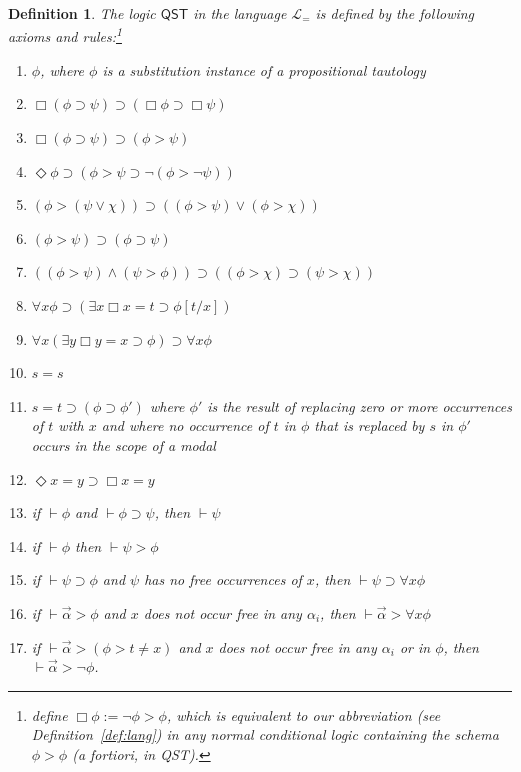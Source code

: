 \documentclass[12pt]{article}
\newtheorem{definition}{Definition}
\newcommand{\would}{\mathbin{>}}
\newcommand{\nec}{\mathop{\Box}}
\newcommand{\pos}{\mathop{\Diamond}}
\newcommand{\then}{\mathbin{\supset}}
\begin{document}
\begin{definition}
\label{def:ST}
    The logic $\mathsf{QST}$ in the language $\mathcal{L}_=$ is defined by the following axioms and rules:\footnote{\cite[p.~25]{StalnakerThomason1970} define $\nec\phi:=\neg\phi\would\phi$, which is equivalent to our abbreviation (see Definition~\ref{def:lang}) in any normal conditional logic containing the schema $\phi\would\phi$ (a fortiori, in \textsf{QST}).} 
    \begin{enumerate}
        \item $\phi$, where $\phi$ is a substitution instance of a propositional tautology
        \item $\nec(\phi \then \psi) \then (\nec\phi \then \nec\psi)$
        \item $\nec(\phi \then \psi) \then (\phi \would \psi)$
        \item $\pos\phi \then (\phi \would \psi \then \neg(\phi \would \neg\psi))$
        \item $(\phi \would (\psi \vee \chi)) \then ((\phi \would \psi) \vee (\phi \would \chi))$
        \item $(\phi \would \psi) \then (\phi \then \psi)$
        \item $((\phi \would \psi) \wedge (\psi \would \phi)) \then ((\phi \would \chi) \then (\psi \would \chi))$
        \item $\forall x\phi \then (\exists x\nec x=t \then \phi[t/x])$
        \item $\forall x (\exists y \nec y=x \then \phi) \then \forall x \phi$
        \item $s=s$
        \item $s=t\then (\phi \then \phi')$ where $\phi'$ is the result of replacing zero or more occurrences of $t$ with $x$ and where no occurrence of $t$ in $\phi$ that is replaced by $s$ in $\phi'$ occurs in the scope of a modal
        \item $\pos x=y \then \nec x=y$
        \item if $\vdash \phi$ and $\vdash \phi \then \psi$, then $\vdash \psi$
        \item if $\vdash \phi$ then $\vdash \psi \would \phi$
        \item if $\vdash \psi \then \phi$ and $\psi$ has no free occurrences of $x$, then $\vdash \psi \then \forall x\phi$
        \item if $\vdash \vec{\alpha} \would \phi$ and $x$ does not occur free in any $\alpha_i$, then $\vdash \vec{\alpha} \would \forall x\phi$
        \item if $\vdash \vec{\alpha} \would (\phi \would t \neq x)$ and $x$ does not occur free in any $\alpha_i$ or in $\phi$, then $\vdash \vec{\alpha} \would \neg\phi$.%

\end{enumerate}
\end{definition}
\end{document}
